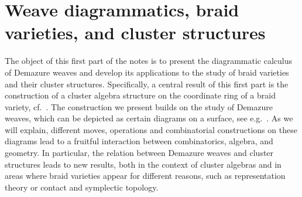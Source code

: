 \part{\centering Weave diagrammatics, braid varieties, and cluster structures}

The object of this first part of the notes is to present the diagrammatic calculus of Demazure weaves and develop its applications to the study of braid varieties and their cluster structures. Specifically, a central result of this first part is the construction of a cluster algebra structure on the coordinate ring of a braid variety, cf.~. The construction we present builds on the study of Demazure weaves, which can be depicted as certain diagrams on a surface, see e.g.~. As we will explain, different moves, operations and combinatorial constructions on these diagrams lead to a fruitful interaction between combinatorics, algebra, and geometry. In particular, the relation between Demazure weaves and cluster structures leads to new results, both in the context of cluster algebras and in areas where braid varieties appear for different reasons, such as representation theory or contact and symplectic topology.